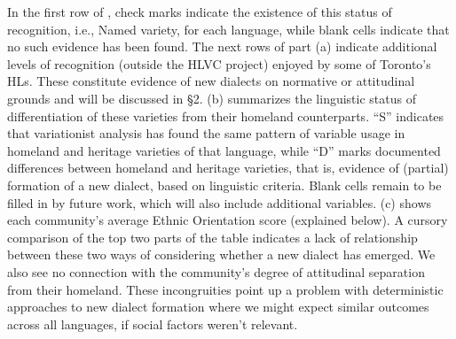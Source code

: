 \documentclass[output=paper]{LSP/langsci}
\begin{document}
In the first row of , check marks indicate the existence of this status of recognition, i.e., Named variety, for each language, while blank cells indicate that no such evidence has been found. The next rows of part (a) indicate additional levels of recognition (outside the HLVC project) enjoyed by some of Toronto’s HLs. These constitute evidence of new dialects on normative or attitudinal grounds and will be discussed in §2.  (b) summarizes the linguistic status of differentiation of these varieties from their homeland counterparts. “S” indicates that variationist analysis has found the same pattern of variable usage in homeland and heritage varieties of that language, while “D” marks documented differences between homeland and heritage varieties, that is, evidence of (partial) formation of a new dialect, based on linguistic criteria. Blank cells remain to be filled in by future work, which will also include additional variables.  (c) shows each community’s average Ethnic Orientation score (explained below). A cursory comparison of the top two parts of the table indicates a lack of relationship between these two ways of considering whether a new dialect has emerged. We also see no connection with the community’s degree of attitudinal separation from their homeland. These incongruities point up a problem with deterministic approaches to new dialect formation where we might expect similar outcomes across all languages, if social factors weren’t relevant.
\end{document}
